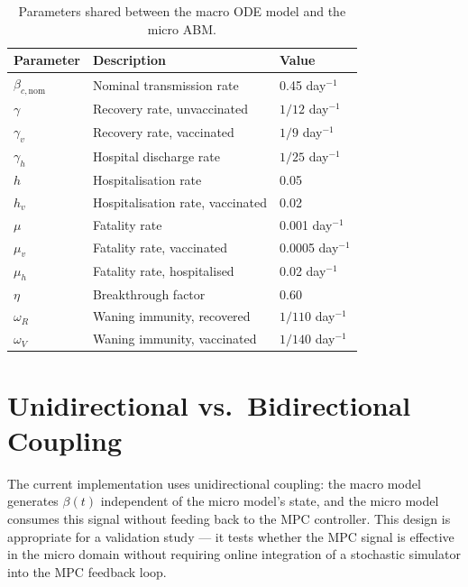 \begin{table}[ht]
\centering
\caption{Parameters shared between the macro ODE model and the micro ABM.}
\label{tab:shared_params}
\begin{tabular}{@{}lll@{}}
\toprule
\textbf{Parameter} & \textbf{Description} & \textbf{Value} \\
\midrule
$\beta_{c,{\mathrm{nom}}}$ & Nominal transmission rate & 0.45 day$^{-1}$ \\
$\gamma$    & Recovery rate, unvaccinated  & $1/12$ day$^{-1}$ \\
$\gamma_v$  & Recovery rate, vaccinated    & $1/9$ day$^{-1}$ \\
$\gamma_h$  & Hospital discharge rate      & $1/25$ day$^{-1}$ \\
$h$         & Hospitalisation rate         & 0.05 \\
$h_v$       & Hospitalisation rate, vaccinated & 0.02 \\
$\mu$       & Fatality rate                & 0.001 day$^{-1}$ \\
$\mu_v$     & Fatality rate, vaccinated    & 0.0005 day$^{-1}$ \\
$\mu_h$     & Fatality rate, hospitalised  & 0.02 day$^{-1}$ \\
$\eta$      & Breakthrough factor          & 0.60 \\
$\omega_R$  & Waning immunity, recovered   & $1/110$ day$^{-1}$ \\
$\omega_V$  & Waning immunity, vaccinated  & $1/140$ day$^{-1}$ \\
\bottomrule
\end{tabular}
\end{table}

\section{Unidirectional vs.\ Bidirectional Coupling}
\label{sec:coupling}

The current implementation uses unidirectional coupling: the macro model generates $\beta(t)$ independent of the micro model's state, and the micro model consumes this signal without feeding back to the MPC controller.
This design is appropriate for a validation study --- it tests whether the MPC signal is effective in the micro domain without requiring online integration of a stochastic simulator into the MPC feedback loop.


